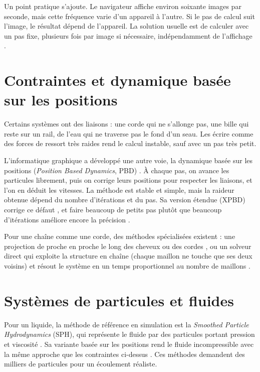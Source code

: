 Un point pratique s'ajoute. Le navigateur affiche environ soixante images par
seconde, mais cette fréquence varie d'un appareil à l'autre. Si le pas de
calcul suit l'image, le résultat dépend de l'appareil. La solution usuelle
est de calculer avec un pas fixe, plusieurs fois par image si nécessaire,
indépendamment de l'affichage \cite{fiedler2004timestep}.

\section{Contraintes et dynamique basée sur les positions}

Certains systèmes ont des liaisons : une corde qui ne s'allonge pas, une
bille qui reste sur un rail, de l'eau qui ne traverse pas le fond d'un seau.
Les écrire comme des forces de ressort très raides rend le calcul instable,
sauf avec un pas très petit.

L'informatique graphique a développé une autre voie, la dynamique basée sur
les positions (\emph{Position Based Dynamics}, PBD) \cite{jakobsen2001,
muller2007pbd, bender2014survey}. À chaque pas, on avance les particules
librement, puis on corrige leurs positions pour respecter les liaisons, et
l'on en déduit les vitesses. La méthode est stable et simple, mais la raideur
obtenue dépend du nombre d'itérations et du pas. Sa version étendue (XPBD)
corrige ce défaut \cite{macklin2016xpbd}, et faire beaucoup de petits pas
plutôt que beaucoup d'itérations améliore encore la précision
\cite{macklin2019smallsteps}.

Pour une chaîne comme une corde, des méthodes spécialisées existent : une
projection de proche en proche le long des cheveux ou des cordes
\cite{muller2012ftl}, ou un solveur direct qui exploite la structure en
chaîne (chaque maillon ne touche que ses deux voisins) et résout le système
en un temps proportionnel au nombre de maillons \cite{deul2018direct}.

\section{Systèmes de particules et fluides}

Pour un liquide, la méthode de référence en simulation est la
\emph{Smoothed Particle Hydrodynamics} (SPH), qui représente le fluide par des
particules portant pression et viscosité \cite{monaghan1992sph}. Sa variante
basée sur les positions rend le fluide incompressible avec la même approche
que les contraintes ci-dessus \cite{macklin2013pbf}. Ces méthodes demandent
des milliers de particules pour un écoulement réaliste.


